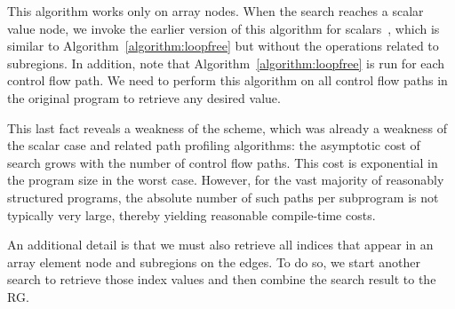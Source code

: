This algorithm works only on array nodes.
When the search reaches a scalar value node, we invoke the earlier version of this algorithm for scalars~\cite{Hou2012}, which is similar to Algorithm~\ref{algorithm:loopfree} but without the operations related to subregions.
In addition, note that Algorithm~\ref{algorithm:loopfree} is run for each control flow path.
We need to perform this algorithm on all control flow paths in the original program to retrieve any desired value.

This last fact reveals a weakness of the scheme, which was already a weakness of the scalar case and related path profiling algorithms:
the asymptotic cost of search grows with the number of control flow paths.
This cost is exponential in the program size in the worst case.
However, for the vast majority of reasonably structured programs, the absolute number of such paths per subprogram is not typically very large, thereby yielding reasonable compile-time costs.

An additional detail is that we must also retrieve all indices that appear in an array element node and subregions on the edges.
To do so, we start another search to retrieve those index values and then combine the search result to the RG.
 

